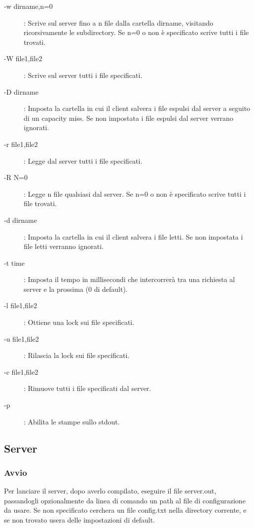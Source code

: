 \documentclass[11pt]{article}
\begin{document}
\begin{flushleft}
\begin{description}
\item[-w dirname\lbrack ,n=0\rbrack]: Scrive sul server fino a n file dalla cartella dirname, visitando ricorsivamente le subdirectory. Se n=0 o non è specificato scrive tutti i file trovati.

\item[-W file1\lbrack ,file2\rbrack]: Scrive sul server tutti i file specificati.

\item[-D dirname]: Imposta la cartella in cui il client salvera i file espulsi dal server a seguito di un capacity miss. Se non impostata i file espulsi dal server verrano ignorati.

\item[-r file1\lbrack ,file2\rbrack]: Legge dal server tutti i file specificati.

\item[-R \lbrack N=0\rbrack]: Legge n file qualsiasi dal server. Se n=0 o non è specificato scrive tutti i file trovati.

\item[-d dirname]: Imposta la cartella in cui il client salvera i file letti. Se non impostata i file letti verranno ignorati.

\item[-t time]: Imposta il tempo in millisecondi che intercorrerà tra una richiesta al server e la prossima (0 di default).

\item[-l file1\lbrack ,file2\rbrack]: Ottiene una lock sui file specificati.

\item[-u file1\lbrack ,file2\rbrack]: Rilascia la lock sui file specificati.

\item[-c file1\lbrack ,file2\rbrack]: Rimuove tutti i file specificati dal server.

\item[-p]: Abilita le stampe sullo stdout.

\end{description}


\subsection{Server}
\subsubsection{Avvio}

Per lanciare il server, dopo averlo compilato, eseguire il file server.out, passandogli opzionalmente da linea di comando un path al file di configurazione da usare. Se non specificato cerchera un file config.txt nella directory corrente, e se non trovato usera delle impostazioni di default.


\end{flushleft}
\end{document}
